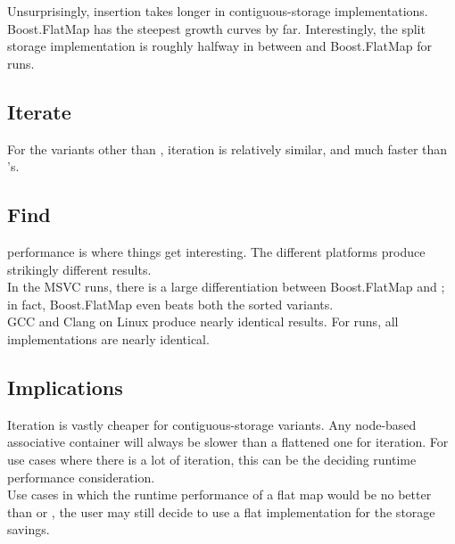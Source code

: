 
Unsurprisingly, insertion takes longer in contiguous-storage implementations.
Boost.FlatMap has the steepest growth curves by far.  Interestingly, the split
storage implementation is roughly halfway in between  and
Boost.FlatMap for  runs.

\subsection{Iterate}


For the variants other than , iteration is relatively similar, and
much faster than 's.

\subsection{Find}


 performance is where things get interesting.  The different
platforms produce strikingly different results.\\

In the MSVC runs, there is a large differentiation between Boost.FlatMap and
; in fact, Boost.FlatMap even beats both the sorted 
variants.\\

GCC and Clang on Linux produce nearly identical results.  For  runs, all implementations are nearly identical.


\subsection{Implications}

Iteration is vastly cheaper for contiguous-storage variants.  Any node-based
associative container will always be slower than a flattened one for
iteration.  For use cases where there is a lot of iteration, this can be the
deciding runtime performance consideration.\\

Use cases in which the runtime performance of a flat map would be no better
than  or , the user may still decide to use a
flat implementation for the storage savings.
